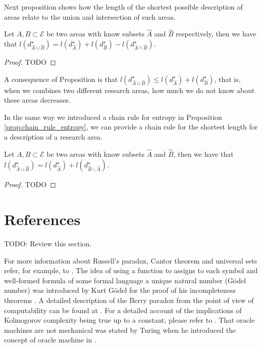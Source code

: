 Next proposition \label{prop:areas_union} shows how the length of the shortest possible description of areas relate to the union and intersection of such areas.

\begin{proposition}
\label{prop:areas_union}
Let $A, B \subset \mathcal{E}$ be two areas with know subsets $\hat{A}$ and $\hat{B}$ respectively, then we have that $l \left( d_{\hat{A} \cup \hat{B}}^{\star} \right) = l \left( d_{\hat{A}}^{\star} \right) + l \left( d_{\hat{B}}^{\star} \right) - l \left( d_{\hat{A} \cap \hat{B}}^{\star} \right)$.
\end{proposition}
\begin{proof}
{\color{red} TODO}
\end{proof}

A consequence of Proposition \label{prop:areas_union} is that $l \left( d_{\hat{A} \cup \hat{B}}^{\star} \right) \leq l \left( d_{\hat{A}}^{\star} \right) + l \left( d_{\hat{B}}^{\star} \right)$, that is, when we combines two different research areas, how much we do not know about these areas decreases.

In the same way we introduced a chain rule for entropy in Proposition \ref{prop:chain_rule_entropy}, we can provide a chain rule for the shortest length for a description of a research area.

\begin{proposition}
Let $A, B \subset \mathcal{E}$ be two areas with know subsets $\hat{A}$ and $\hat{B}$, then we have that $l \left( d_{\hat{A} \cup \hat{B}}^{\star} \right) = l \left( d_{\hat{A}}^{\star} \right) + l \left( d_{\hat{B} \backslash \hat{A}}^{\star} \right)$.
\end{proposition}
\begin{proof}
{\color{red} TODO}
\end{proof}

%
%

\section{References}

{\color{red} TODO: Review this section.}

For more information about Russell's paradox, Cantor theorem and universal sets refer, for example, to \cite{jech2013set}. The idea of using a function to assigns to each symbol and well-formed formula of some formal language a unique natural number (Gödel number) was introduced by Kurt Gödel for the proof of his incompleteness theorems \cite{godel1931formal}. A detailed description of the Berry paradox from the point of view of computability can be found at \cite{chaitin1995berry}. For a detailed account of the implications of Kolmogorov complexity being true up to a constant, please refer to \cite{li2013introduction}. That oracle machines are not mechanical was stated by Turing when he introduced the concept of oracle machine in \cite{turing1939systems}.

